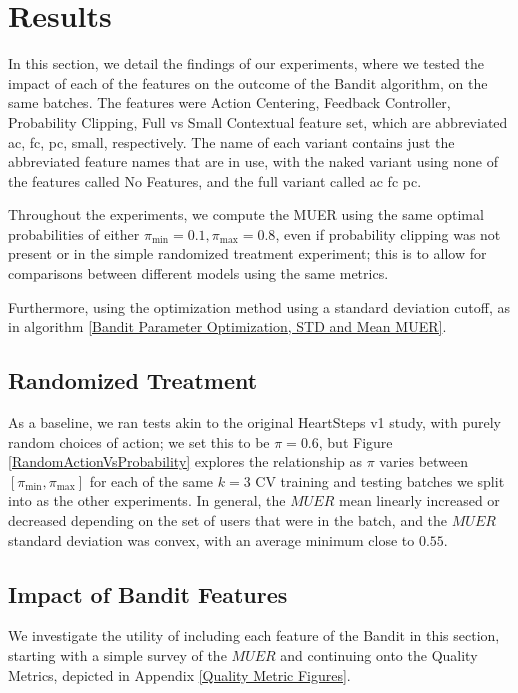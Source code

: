 \chapter{Results}
\label{Results}

In this section, we detail the findings of our experiments, where we tested the impact of each of the features on the outcome of the Bandit algorithm, on the same batches.  The features were Action Centering, Feedback Controller, Probability Clipping, Full vs Small Contextual feature set, which are abbreviated ac, fc, pc, small, respectively.  The name of each variant contains just the abbreviated feature names that are in use, with the naked variant using none of the features called No Features, and the full variant called ac fc pc.

Throughout the experiments, we compute the MUER using the same optimal probabilities of either $\pi_\text{min} = 0.1, \pi_\text{max} = 0.8$, even if probability clipping was not present or in the simple randomized treatment experiment; this is to allow for comparisons between different models using the same metrics.

Furthermore, using the optimization method using a standard deviation cutoff, as in algorithm \ref{Bandit Parameter Optimization, STD and Mean MUER}.


\section{Randomized Treatment}

As a baseline, we ran tests akin to the original HeartSteps v1 study, with purely random choices of action; we set this to be $\pi = 0.6$, but Figure \ref{RandomActionVsProbability} explores the relationship as $\pi$ varies between $[\pi_\text{min}, \pi_\text{max}]$ for each of the same $k=3$ CV training and testing batches we split into as the other experiments.  In general, the $MUER$ mean linearly increased or decreased depending on the set of users that were in the batch, and the $MUER$ standard deviation was convex, with an average minimum close to $0.55$.

\clearpage

\section{Impact of Bandit Features}

We investigate the utility of including each feature of the Bandit in this section, starting with a simple survey of the $MUER$ and continuing onto the Quality Metrics, depicted in Appendix \ref{Quality Metric Figures}.


